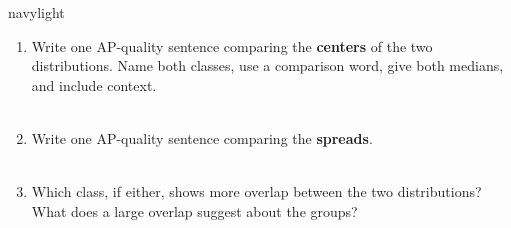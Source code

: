 \documentclass[10pt]{article}
\begin{document}
\begin{blurbbox}{navylight}
\begin{enumerate}[leftmargin=1.5em, itemsep=8pt]
  \item Write one AP-quality sentence comparing the \textbf{centers} of the
        two distributions. Name both classes, use a comparison word, give
        both medians, and include context.\\[5pt]
        \writeline\\[1pt]\writeline

  \item Write one AP-quality sentence comparing the \textbf{spreads}.\\[5pt]
        \writeline\\[1pt]\writeline

  \item Which class, if either, shows more overlap between the two
        distributions? What does a large overlap suggest about the groups?\\[5pt]
        \writeline\\[1pt]\writeline

\end{enumerate}

\end{blurbbox}

\vspace{0.12in}
\end{document}
